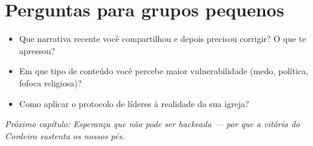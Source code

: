 \section{Perguntas para grupos pequenos}
\begin{itemize}[leftmargin=*,noitemsep]
  \item Que narrativa recente você compartilhou e depois precisou corrigir? O que te apressou?
  \item Em que tipo de conteúdo você percebe maior vulnerabilidade (medo, política, fofoca religiosa)?
  \item Como aplicar o protocolo de líderes à realidade da sua igreja?
\end{itemize}

\bigskip
\noindent\textit{Próximo capítulo: Esperança que não pode ser hackeada --- por que a vitória do Cordeiro sustenta os nossos pés.}
